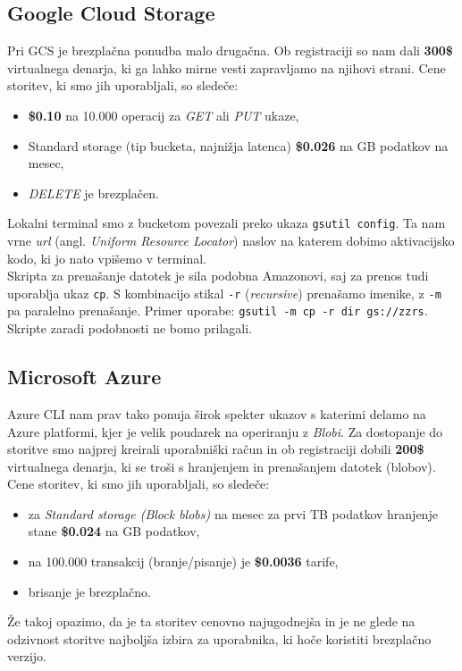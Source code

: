\documentclass[11pt]{article}
\begin{document}
\subsection{Google Cloud Storage}
Pri GCS je brezplačna ponudba malo drugačna. Ob registraciji so nam dali \textbf{300\$} virtualnega denarja, ki ga lahko mirne vesti zapravljamo na njihovi strani. Cene storitev, ki smo jih uporabljali, so sledeče:
\begin{itemize}
    \item \textbf{\$0.10} na 10.000 operacij za \textit{GET} ali \textit{PUT} ukaze,
    \item Standard storage (tip bucketa, najnižja latenca) \textbf{\$0.026} na GB podatkov na mesec,
    \item \textit{DELETE} je brezplačen.
\end{itemize}
Lokalni terminal smo z bucketom povezali preko ukaza \texttt{gsutil config}. Ta nam vrne \textit{url} (angl. \textit{Uniform Resource Locator}) naslov na katerem dobimo aktivacijsko kodo, ki jo nato vpišemo v terminal. \\

Skripta za prenašanje datotek je sila podobna Amazonovi, saj za prenos tudi uporablja ukaz \texttt{cp}. S kombinacijo stikal \texttt{-r} (\textit{recursive}) prenašamo imenike,  z \texttt{-m} pa paralelno prenašanje.
Primer uporabe: \texttt{gsutil -m cp -r dir gs://zzrs}. Skripte zaradi podobnosti ne bomo prilagali.

\subsection{Microsoft Azure}
Azure CLI nam prav tako ponuja širok spekter ukazov s katerimi delamo na Azure platformi, kjer je velik poudarek na operiranju z \textit{Blobi}. Za dostopanje do storitve smo najprej kreirali uporabniški račun in ob registraciji dobili \textbf{200\$} virtualnega denarja, ki se troši s hranjenjem in prenašanjem datotek (blobov). Cene storitev, ki smo jih uporabljali, so sledeče:
\begin{itemize}
    \item za \textit{Standard storage (Block blobs)} na mesec za prvi TB podatkov hranjenje stane \textbf{\$0.024} na GB podatkov,
    \item na 100.000 transakcij (branje/pisanje) je \textbf{\$0.0036} tarife,
    \item brisanje je brezplačno.
\end{itemize}
Že takoj opazimo, da je ta storitev cenovno najugodnejša in je ne glede na odzivnost storitve najboljša izbira za uporabnika, ki hoče koristiti brezplačno verzijo. \\  
\end{document}
